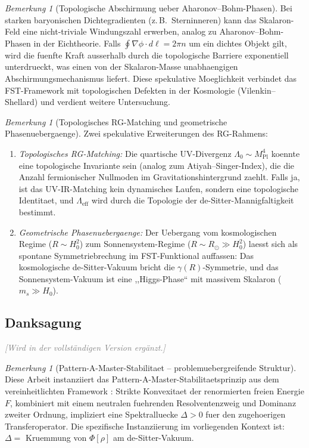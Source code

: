\documentclass[12pt,a4paper]{article}
\theoremstyle{definition}
\theoremstyle{plain}
\theoremstyle{remark}
\newtheorem{remark}[definition]{Bemerkung}
\begin{document}
\begin{remark}[Topologische Abschirmung ueber Aharonov--Bohm-Phasen]
\label{rem:topological-screening}
Bei starken baryonischen Dichtegradienten (z.\,B.\ Sterninneren) kann das Skalaron-Feld eine nicht-triviale Windungszahl erwerben, analog zu Aharonov--Bohm-Phasen in der Eichtheorie. Falls $\oint \nabla\phi \cdot d\ell = 2\pi n$ um ein dichtes Objekt gilt, wird die fuenfte Kraft ausserhalb durch die topologische Barriere exponentiell unterdrueckt, was einen von der Skalaron-Masse unabhaengigen Abschirmungsmechanismus liefert. Diese spekulative Moeglichkeit verbindet das FST-Framework mit topologischen Defekten in der Kosmologie (Vilenkin--Shellard) und verdient weitere Untersuchung.
\end{remark}

\begin{remark}[Topologisches RG-Matching und geometrische Phasenuebergaenge]
\label{rem:topological-rg}
Zwei spekulative Erweiterungen des RG-Rahmens:
\begin{enumerate}
\item \emph{Topologisches RG-Matching:} Die quartische UV-Divergenz $\Lambda_0 \sim M_{\mathrm{Pl}}^4$ koennte eine topologische Invariante sein (analog zum Atiyah--Singer-Index), die die Anzahl fermionischer Nullmoden im Gravitationshintergrund zaehlt. Falls ja, ist das UV-IR-Matching kein dynamisches Laufen, sondern eine topologische Identitaet, und $\Lambda_{\mathrm{eff}}$ wird durch die Topologie der de-Sitter-Mannigfaltigkeit bestimmt.
\item \emph{Geometrische Phasenuebergaenge:} Der Uebergang vom kosmologischen Regime ($R \sim H_0^2$) zum Sonnensystem-Regime ($R \sim R_\odot \gg H_0^2$) laesst sich als spontane Symmetriebrechung im FST-Funktional auffassen: Das kosmologische de-Sitter-Vakuum bricht die $\gamma(R)$-Symmetrie, und das Sonnensystem-Vakuum ist eine ,,Higgs-Phase`` mit massivem Skalaron ($m_s \gg H_0$).
\end{enumerate}
\end{remark}

\subsection*{Danksagung}

\textcolor{gray}{\textit{[Wird in der vollst\"andigen Version erg\"anzt.]}}

\begin{remark}[Pattern-A-Master-Stabilitaet -- problemuebergreifende Struktur]
Diese Arbeit instanziiert das Pattern-A-Master-Stabilitaetsprinzip aus dem vereinheitlichten Framework \cite{FST-Unified2026}: Strikte Konvexitaet der renormierten freien Energie $F$, kombiniert mit einem neutralen fuehrenden Resolventenzweig und Dominanz zweiter Ordnung, impliziert eine Spektralluecke $\Delta > 0$ fuer den zugehoerigen Transferoperator. Die spezifische Instanziierung im vorliegenden Kontext ist: $\Delta = $ Kruemmung von $\Phi[\rho]$ am de-Sitter-Vakuum.
\end{remark}
\end{document}
